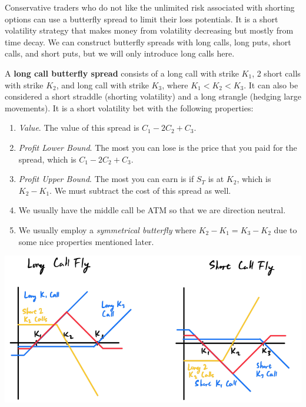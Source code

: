 \documentclass{article}
\begin{document}
    Conservative traders who do not like the unlimited risk associated with shorting options can use a butterfly spread to limit their loss potentials. It is a short volatility strategy that makes money from volatility decreasing but mostly from time decay. We can construct butterfly spreads with long calls, long puts, short calls, and short puts, but we will only introduce long calls here. 

    \begin{definition}
      A \textbf{long call butterfly spread} consists of a long call with strike $K_1$, 2 short calls with strike $K_2$, and long call with strike $K_3$, where $K_1 < K_2 < K_3$. It can also be considered a short straddle (shorting volatility) and a long strangle (hedging large movements). It is a short volatility bet with the following properties: 
      \begin{enumerate}
        \item \textit{Value}. The value of this spread is $C_1 - 2C_2 + C_3$. 
        \item \textit{Profit Lower Bound}. The most you can lose is the price that you paid for the spread, which is $C_1 - 2C_2 + C_3$. 
        \item \textit{Profit Upper Bound}. The most you can earn is if $S_T$ is at $K_2$, which is $K_2 - K_1$. We must subtract the cost of this spread as well. 
        \item We usually have the middle call be ATM so that we are direction neutral. 
        \item We usually employ a \textit{symmetrical butterfly} where $K_2 - K_1 = K_3 - K_2$ due to some nice properties mentioned later. 
      \end{enumerate}

      \begin{center}
        \includegraphics[scale=0.35]{img/call_fly.png}
      \end{center}
    \end{definition}
\end{document}
